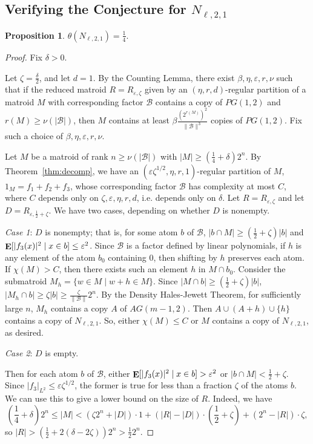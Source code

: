 \documentclass{article}
\theoremstyle{plain}
\newtheorem{prop}[theorem]{Proposition}
\theoremstyle{definition}
\theoremstyle{definition}
\theoremstyle{remark}
\numberwithin{equation}{section}
\newcommand{\Esymb}{{\bf E}}
\DeclareMathOperator*{\E}{\Esymb}
\newcommand{\cB}{\mathcal B}
\begin{document}
\subsection{Verifying the Conjecture for \texorpdfstring{$N_{\ell,2,1}$}{N\_(l,2,1)}}
\label{sec:vernm1}
\begin{prop}
\label{prop:nm1}
$\theta(N_{\ell,2,1})=\frac{1}{4}.$
\end{prop}
\begin{proof}
Fix $\delta>0$. 

Let $\zeta=\frac{\delta}{2}$, and let $d=1$. By the Counting Lemma, there exist $\beta, \eta, \varepsilon, r, \nu$ such that if the reduced matroid $R=R_{\varepsilon,\zeta}$ given by an $(\eta,r,d)$-regular partition of a matroid $M$ with corresponding factor $\cB$ contains a copy of $PG(1,2)$ and $r(M)\geq \nu(|\cB|)$, then $M$ contains at least $\beta \frac{(2^{r(M)})^{2}}{\|\cB\|^{3}}$ copies of $PG(1,2)$. Fix such a choice of $\beta,\eta,\varepsilon,r,\nu$.

Let $M$ be a matroid of rank $n\geq \nu(|\cB|)$ with $|M|\geq (\frac{1}{4}+\delta)2^n$. By Theorem~\ref{thm:decomp}, we have an $(\varepsilon \zeta^{1/2},\eta,r,1)$-regular partition of $M$, $1_M=f_1+f_2+f_3$, whose corresponding factor $\cB$ has complexity at most $C$, where $C$ depends only on $\zeta,\varepsilon,\eta,r,d$, i.e. depends only on $\delta$. Let $R=R_{\varepsilon,\zeta}$ and let $D=R_{\varepsilon,\frac{1}{2}+\zeta}$.
We have two cases, depending on whether $D$ is nonempty.

\emph{Case 1}: $D$ is nonempty; that is, for some atom $b$ of $\cB$, $|b\cap M|\geq (\frac{1}{2}+\zeta)|b|$ and $\E[|f_3(x)|^2\mid x\in b]\leq \varepsilon^2$. Since $\cB$ is a factor defined by linear polynomials, if $h$ is any element of the atom $b_0$ containing $0$, then shifting by $h$ preserves each atom. If $\chi(M)>C$, then there exists such an element $h$ in $M\cap b_0$. Consider the submatroid $M_h=\{w\in M \mid w+h\in M\}$. Since $|M\cap b|\geq (\frac{1}{2}+\zeta)|b|$, $|M_h\cap b|\geq \zeta |b|\geq \frac{\zeta}{\|\cB\|} 2^n$. By the Density Hales-Jewett Theorem, for sufficiently large $n$, $M_h$ contains a copy $A$ of $AG(m-1,2)$. Then $A\cup (A+h)\cup \{h\}$ contains a copy of $N_{\ell,2,1}$. So, either $\chi(M)\leq C$ or $M$ contains a copy of $N_{\ell,2,1}$, as desired.

\emph{Case 2}: $D$ is empty.

Then for each atom $b$ of $\cB$, either $\E[|f_3(x)|^2\mid x\in b]> \varepsilon^2$ or $|b\cap M| < \frac{1}{2}+\zeta$. Since $|f_3|_{L^2}\leq \varepsilon\zeta^{1/2}$, the former is true for less than a fraction $\zeta$ of the atoms $b$. We can use this to give a lower bound on the size of $R$. Indeed, we have
\[(\frac{1}{4}+\delta)2^n\leq |M|< (\zeta 2^n + |D|) \cdot 1 + (|R|-|D|)\cdot (\frac{1}{2}+\zeta) + (2^n-|R|)\cdot \zeta,\]
so $|R|> (\frac{1}{2}+2(\delta-2\zeta)) 2^{n}>\frac{1}{2}2^n$.


\end{proof}
\end{document}
